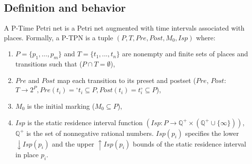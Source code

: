\documentclass[submission,copyright,creativecommons]{eptcs}
\numberwithin{equation}{section}
\begin{document}
\subsection{Definition and behavior} \label{semantics}
A P-Time Petri net is a Petri net augmented with time intervals
associated with places. Formally, a P-TPN is a tuple \((
P, T, Pre, Post, M_{0}, Isp) \) where: \begin{enumerate} \item \(P=\{p_1,...,p_m\}\) and \(T=\{t_1,...,t_n\}\) are nonempty and finite sets of places and transitions such that (\(P \cap T =
\emptyset\)), \item \(Pre\) and \(Post\) map each transition to its preset and postset ($Pre$, $Post:$ \( T
\longrightarrow 2^P, Pre(t_i) = {^{\circ} t_i} \subseteq P,Post(t_i) = { t_i ^{\circ}} \subseteq P\)),
\item \(M_{0}\) is the initial marking (\(
M_{0} \subseteq P\)), \item $Isp$ is the static
residence interval function \((Isp: P \rightarrow  \mathbb{Q}^{+}\times(\mathbb{Q}^{+}\cup
\{\infty\}))\), \(\mathbb{Q}^{+}\) is the set of nonnegative rational
numbers. \(Isp(p_i)\) specifies the lower \({\downarrow Isp(p_i)}\)
and the upper \({\uparrow Isp(p_i)}\) bounds of the static residence
interval in place \(p_i\). \end{enumerate}
\end{document}
